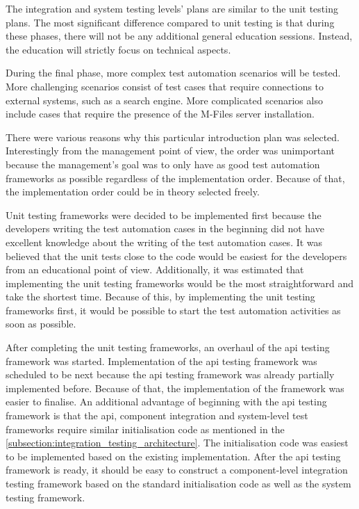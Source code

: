 The integration and system testing levels' plans are similar to the unit testing plans. The most significant difference compared to unit testing is that during these phases, there will not be any additional general education sessions. Instead, the education will strictly focus on technical aspects.

During the final phase, more complex test automation scenarios will be tested. More challenging scenarios consist of test cases that require connections to external systems, such as a search engine. More complicated scenarios also include cases that require the presence of the M-Files server installation.

There were various reasons why this particular introduction plan was selected. Interestingly from the management point of view, the order was unimportant because the management's goal was to only have as good test automation frameworks as possible regardless of the implementation order. Because of that, the implementation order could be in theory selected freely.

Unit testing frameworks were decided to be implemented first because the developers writing the test automation cases in the beginning did not have excellent knowledge about the writing of the test automation cases. It was believed that the unit tests close to the code would be easiest for the developers from an educational point of view. Additionally, it was estimated that implementing the unit testing frameworks would be the most straightforward and take the shortest time. Because of this, by implementing the unit testing frameworks first, it would be possible to start the test automation activities as soon as possible.

After completing the unit testing frameworks, an overhaul of the \gls{api} testing framework was started. Implementation of the \gls{api} testing framework was scheduled to be next because the \gls{api} testing framework was already partially implemented before. Because of that, the implementation of the framework was easier to finalise. An additional advantage of beginning with the \gls{api} testing framework is that the \gls{api}, component integration and system-level test frameworks require similar initialisation code as mentioned in the \autoref{subsection:integration_testing_architecture}. The initialisation code was easiest to be implemented based on the existing implementation. After the \gls{api} testing framework is ready, it should be easy to construct a component-level integration testing framework based on the standard initialisation code as well as the system testing framework.


